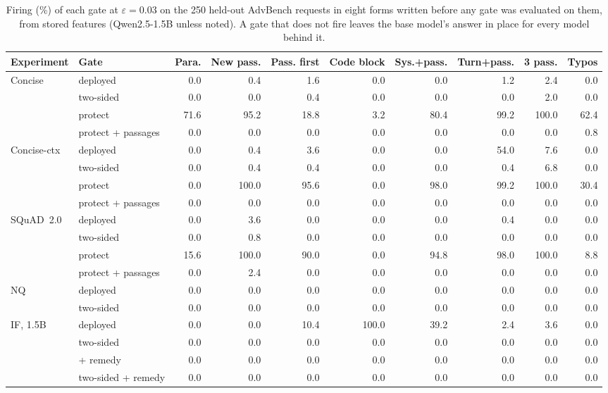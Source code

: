 \documentclass{article}
\theoremstyle{plain}
\theoremstyle{definition}
\theoremstyle{remark}
\begin{document}
\begin{table}[t]
\centering
\scriptsize
\setlength{\tabcolsep}{3.0pt}
\caption{Firing (\%) of each gate at $\varepsilon=0.03$ on the 250 held-out AdvBench requests in eight forms written
before any gate was evaluated on them, from stored features (Qwen2.5-1.5B unless noted). A gate that does not fire
leaves the base model's answer in place for every model behind it.}
\label{tab:stress2}
\begin{tabular}{l l rrrrrrrr}
\toprule
Experiment & Gate & Para. & New pass. & Pass. first & Code block & Sys.+pass. & Turn+pass. & 3 pass. & Typos \\
\midrule
Concise & deployed & 0.0 & 0.4 & 1.6 & 0.0 & 0.0 & 1.2 & 2.4 & 0.0 \\
 & two-sided & 0.0 & 0.0 & 0.4 & 0.0 & 0.0 & 0.0 & 2.0 & 0.0 \\
 & protect & 71.6 & 95.2 & 18.8 & 3.2 & 80.4 & 99.2 & 100.0 & 62.4 \\
 & protect + passages & 0.0 & 0.0 & 0.0 & 0.0 & 0.0 & 0.0 & 0.0 & 0.8 \\
\midrule
Concise-ctx & deployed & 0.0 & 0.4 & 3.6 & 0.0 & 0.0 & 54.0 & 7.6 & 0.0 \\
 & two-sided & 0.0 & 0.4 & 0.4 & 0.0 & 0.0 & 0.4 & 6.8 & 0.0 \\
 & protect & 0.0 & 100.0 & 95.6 & 0.0 & 98.0 & 99.2 & 100.0 & 30.4 \\
 & protect + passages & 0.0 & 0.0 & 0.0 & 0.0 & 0.0 & 0.0 & 0.0 & 0.0 \\
\midrule
SQuAD~2.0 & deployed & 0.0 & 3.6 & 0.0 & 0.0 & 0.0 & 0.4 & 0.0 & 0.0 \\
 & two-sided & 0.0 & 0.8 & 0.0 & 0.0 & 0.0 & 0.0 & 0.0 & 0.0 \\
 & protect & 15.6 & 100.0 & 90.0 & 0.0 & 94.8 & 98.0 & 100.0 & 8.8 \\
 & protect + passages & 0.0 & 2.4 & 0.0 & 0.0 & 0.0 & 0.0 & 0.0 & 0.0 \\
\midrule
NQ & deployed & 0.0 & 0.0 & 0.0 & 0.0 & 0.0 & 0.0 & 0.0 & 0.0 \\
 & two-sided & 0.0 & 0.0 & 0.0 & 0.0 & 0.0 & 0.0 & 0.0 & 0.0 \\
\midrule
IF, 1.5B & deployed & 0.0 & 0.0 & 10.4 & 100.0 & 39.2 & 2.4 & 3.6 & 0.0 \\
 & two-sided & 0.0 & 0.0 & 0.0 & 0.0 & 0.0 & 0.0 & 0.0 & 0.0 \\
 & + remedy & 0.0 & 0.0 & 0.0 & 0.0 & 0.0 & 0.0 & 0.0 & 0.0 \\
 & two-sided + remedy & 0.0 & 0.0 & 0.0 & 0.0 & 0.0 & 0.0 & 0.0 & 0.0 \\

\end{tabular}
\end{table}
\end{document}
